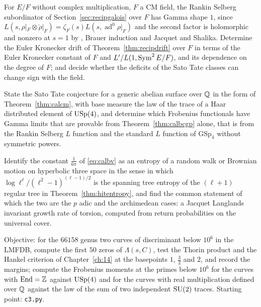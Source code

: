 \begin{problem}\label{op:calshape}
For $E/F$ without complex multiplication, $F$ a CM field, the Rankin Selberg subordinator of Section~\ref{sec:recipgalois} over $F$ has Gamma shape $1$, since $L(s,\rho|_F\otimes\check\rho|_F)=\zeta_F(s)L(s,\operatorname{ad}^0\rho|_F)$ and the second factor is holomorphic and nonzero at $s=1$ by \cite{accghlnstt2023}, Brauer induction and Jacquet and Shalika. Determine the Euler Kronecker drift of Theorem~\ref{thm:recipdrift} over $F$ in terms of the Euler Kronecker constant of $F$ and $L'/L(1,\operatorname{Sym}^2E/F)$, and its dependence on the degree of $F$; and decide whether the deficits of the Sato Tate classes can change sign with the field.
\end{problem}

\begin{problem}\label{op:calg2}
State the Sato Tate conjecture for a generic abelian surface over $\mathbb{Q}$ in the form of Theorem~\ref{thm:calcm}, with base measure the law of the trace of a Haar distributed element of $\mathrm{USp}(4)$, and determine which Frobenius functionals have Gamma limits that are provable from Theorem~\ref{thm:calbcgp} alone, that is from the Rankin Selberg $L$ function and the standard $L$ function of $\mathrm{GSp}_4$ without symmetric powers.
\end{problem}

\begin{problem}\label{op:caltorsion}
Identify the constant $\frac1{6\pi}$ of \eqref{eq:calbv} as an entropy of a random walk or Brownian motion on hyperbolic three space in the sense in which $\log\ell^\ell/(\ell^2-1)^{(\ell-1)/2}$ is the spanning tree entropy of the $(\ell+1)$ regular tree in Theorem~\ref{thm:hitentropy}, and find the common statement of which the two are the $p$ adic and the archimedean cases: a Jacquet Langlands invariant growth rate of torsion, computed from return probabilities on the universal cover.
\end{problem}

\begin{compproblem}\label{cp:calg2}
Objective: for the $66158$ genus two curves of discriminant below $10^6$ in the LMFDB, compute the first $50$ zeros of $\Lambda(s,C)$, test the Thorin product and the Hankel criterion of Chapter~\ref{ch:14} at the basepoints $1$, $\frac32$ and $2$, and record the margins; compute the Frobenius moments at the primes below $10^6$ for the curves with $\operatorname{End}=\mathbb{Z}$ against $\mathrm{USp}(4)$ and for the curves with real multiplication defined over $\mathbb{Q}$ against the law of the sum of two independent $\mathrm{SU}(2)$ traces. Starting point: \texttt{c3.py}.
\end{compproblem}
